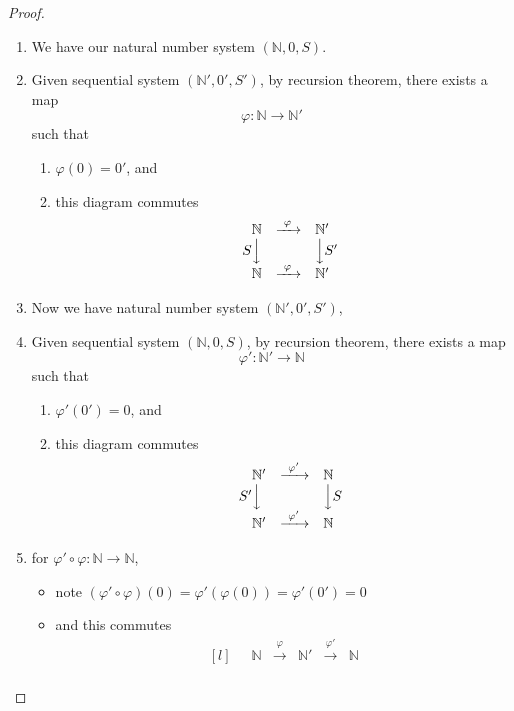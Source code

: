 \documentclass[12pt]{article}
\newenvironment{prf}
{
    \begin{proof}
        \hfill
        \begin{enumerate}[label*=\arabic*.]
                }
                {
                \hfill\qedsymbol
        \end{enumerate}
    \renewcommand{\qedsymbol}{}
    \end{proof}
}
\theoremstyle{definition}
\newcommand{\nat}{\mathbb{N}}
\let\phi\varphi
\begin{document}
\begin{prf}
\item We have our natural number system $(\nat, 0, S)$.
\item Given sequential system $(\nat', 0', S')$, by recursion theorem, there exists a map
    $$\phi: \nat \to \nat'$$ such that
    \begin{enumerate}[label=(\roman*)]
        \item $\phi(0) = 0'$, and
        \item this diagram commutes
            $$ \begin{matrix*}[l]
                &\phantom{S}\nat &\xrightarrow{\ \phi\ } &\nat' \\
                &S\Big\downarrow & &\Big\downarrow S'         \\
                &\phantom{S}\nat &\xrightarrow{\ \phi\ } &\nat'
            \end{matrix*} $$
    \end{enumerate}
\item Now we have natural number system $(\nat', 0', S')$,
\item Given sequential system $(\nat, 0, S)$, by recursion theorem, there exists a map
    $$\phi': \nat' \to \nat$$ such that
    \begin{enumerate}[label=(\roman*)]
        \item $\phi'(0') = 0$, and
        \item this diagram commutes
            $$ \begin{matrix*}[l]
                &\phantom{S'}\nat' &\xrightarrow{\ \phi'\ } &\nat  \\
                &S'\Big\downarrow &&\Big\downarrow S  \\
                &\phantom{S'}\nat' &\xrightarrow{\ \phi'\ } &\nat
            \end{matrix*} $$
    \end{enumerate}
\item for $\phi'\circ\phi: \nat\to\nat$, \label{thm:uniqnatnum_step_symmetry}
    \begin{itemize}
        \item note $(\phi'\circ\phi)(0) = \phi'(\phi(0)) = \phi'(0') = 0$
        \item and this commutes
            $$ \begin{matrix*}[l]
                &\phantom{S}\nat &\xrightarrow{\ \phi\ } &\nat' &\xrightarrow{\ \phi'\ } &\nat  \\

\end{matrix*}$$
\end{itemize}
\end{prf}
\end{document}
